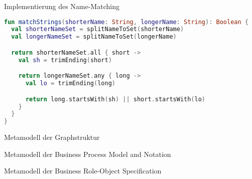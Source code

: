 \begin{frame}[fragile]{Implementierung des Name-Matching}
\begin{lstlisting}[language=Kotlin]
fun matchStrings(shorterName: String, longerName: String): Boolean {
  val shorterNameSet = splitNameToSet(shorterName)
  val longerNameSet = splitNameToSet(longerName)

  return shorterNameSet.all { short ->
    val sh = trimEnding(short)

    return longerNameSet.any { long ->
      val lo = trimEnding(long)

      return long.startsWith(sh) || short.startsWith(lo)
    }
  }
}
\end{lstlisting}
\end{frame}

\begin{frame}{Metamodell der Graphstruktur}
  
\end{frame}

\begin{frame}{Metamodell der Business Process Model and Notation}
  
\end{frame}

\begin{frame}{Metamodell der Business Role-Object Specification}
  
\end{frame}
